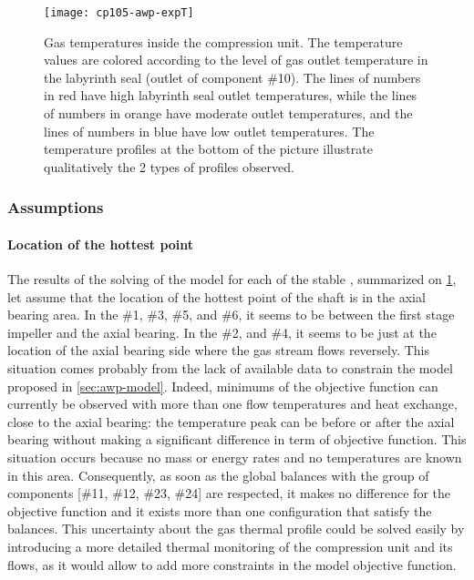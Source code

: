 \begin{figure}[htbp]
  \texttt{[image: cp105-awp-expT]}
  \caption[Gas temperatures inside the compression unit]{Gas
    temperatures inside the compression unit. The temperature values
    are colored according to the level of gas outlet temperature in
    the labyrinth seal (outlet of component \#10). The lines of
    numbers in red have high labyrinth seal outlet temperatures, while
    the lines of numbers in orange have moderate outlet temperatures,
    and the lines of numbers in blue have low outlet temperatures. The
    temperature profiles at the bottom of the picture illustrate
    qualitatively the 2 types of profiles observed.}
  \label{fig:awp-cp-unit-gas-T}
\end{figure}


\subsubsection{Assumptions}
\label{sec:awp-laby-seal-hot-gas-assumptions}


\paragraph{Location of the hottest point}

The results of the solving of the model for each of the stable \OP{},
summarized on \cref{fig:awp-cp-unit-gas-T}, let assume that the
location of the hottest point of the shaft is in the axial bearing
area. In the \OP{} \#1, \#3, \#5, and \#6, it seems to be between the
first stage impeller and the axial bearing. In the \OP{} \#2, and \#4,
it seems to be just at the location of the axial bearing side where
the gas stream flows reversely. This situation comes probably from the
lack of available data to constrain the model proposed in
\cref{sec:awp-model}. Indeed, minimums of the objective function can
currently be observed with more than one flow temperatures and heat
exchange, close to the axial bearing: the temperature peak can be
before or after the axial bearing without making a significant
difference in term of objective function. This situation occurs
because no mass or energy rates and no temperatures are known in this
area. Consequently, as soon as the global balances with the group of
components [\#11, \#12, \#23, \#24] are respected, it makes no
difference for the objective function and it exists more than one
configuration that satisfy the balances. This uncertainty about the
gas thermal profile could be solved easily by introducing a more
detailed thermal monitoring of the compression unit and its flows, as
it would allow to add more constraints in the model objective
function.

